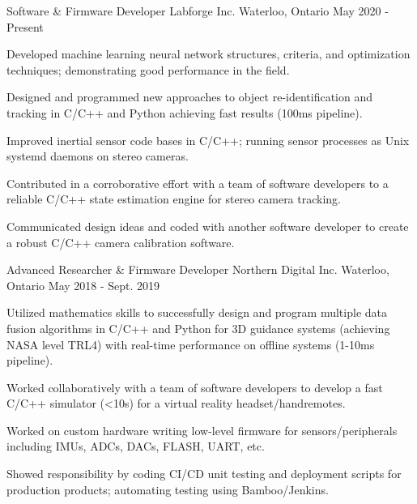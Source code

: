 
\begin{cventries}

  \cventry
    {Software \& Firmware Developer} %
    {Labforge Inc.} %
    {Waterloo, Ontario} %
    {May 2020 - Present} %
    {
      \begin{cvitems} %
        \item {Developed machine learning neural network structures, criteria, and optimization techniques; demonstrating good performance in the field.}
        \item {Designed and programmed new approaches to object re-identification and tracking in C/C++ and Python achieving fast results (100ms pipeline).}
        \item {Improved inertial sensor code bases in C/C++; running sensor processes as Unix systemd daemons on stereo cameras.}
        \item {Contributed in a corroborative effort with a team of software developers to a reliable C/C++ state estimation engine for stereo camera tracking.}
        \item {Communicated design ideas and coded with another software developer to create a robust C/C++ camera calibration software.}
      \end{cvitems}
    }

  \cventry
    {Advanced Researcher \& Firmware Developer} %
    {Northern Digital Inc.} %
    {Waterloo, Ontario} %
    {May 2018 - Sept. 2019} %
    {
      \begin{cvitems} %
        \item {Utilized mathematics skills to successfully design and program multiple data fusion algorithms in C/C++ and Python for 3D guidance systems (achieving NASA level TRL4) with real-time performance on offline systems (1-10ms pipeline).}
        \item {Worked collaboratively with a team of software developers to develop a fast C/C++ simulator (<10s) for a virtual reality headset/handremotes.}
        \item {Worked on custom hardware writing low-level firmware for sensors/peripherals including IMUs, ADCs, DACs, FLASH, UART, etc.}
        \item {Showed responsibility by coding CI/CD unit testing and deployment scripts for production products; automating testing using Bamboo/Jenkins.}
      \end{cvitems}
    }


\end{cventries}
